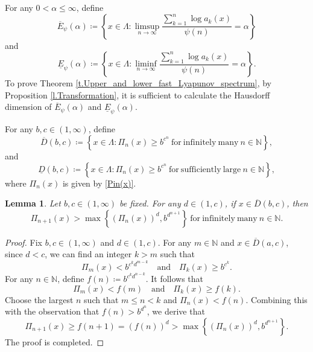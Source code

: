 \documentclass[12pt,reqno]{amsart}
\renewcommand{\=}{\coloneqq}
\theoremstyle{plain}
\newtheorem{lemma}[theorem]{Lemma}
\begin{document}
For any $0< \alpha \leq \infty$, define
\begin{equation*}\label{e.def_E_psi_alpha}
        \overline{E}_{\psi}(\alpha)\coloneqq
        \left\{x\in \Lambda:\limsup_{n \to \infty}
        \frac{\sum_{k=1}^n \log a_{k}(x)}{\psi(n)}= \alpha \right\}
\end{equation*}
and
\[
  \underline{E}_{\psi}(\alpha)\coloneqq
        \left\{x\in \Lambda:\liminf_{n \to \infty}
        \frac{\sum_{k=1}^n \log a_{k}(x)}{\psi(n)}= \alpha \right\}.
\]
To prove Theorem \ref{t.Upper_and_lower_fast_Lyapunov_spectrum}, by Proposition \ref{l.Transformation}, it is sufficient to calculate the Hausdorff dimension of $\overline{E}_{\psi}(\alpha)$ and $\underline{E}_{\psi}(\alpha)$.


For any $b,c \in (1,\infty)$, define
\begin{equation*}
    \overline{D}(b,c)\coloneqq \left\{x\in \Lambda:\Pi_{n}(x)\geq b^{c^n}\
\mathrm{for\ infinitely\ many}\ n\in \mathbb N\right\},
\end{equation*}
 and
 \begin{equation*}
     \underline{D}(b,c)\coloneqq
     \left\{x\in \Lambda: \Pi_{n}(x)\geq b^{c^n}\
\mathrm{for\ sufficiently\ large}\ n\in \mathbb N\right\},
\end{equation*}
where $\Pi_n(x)$ is given by \eqref{Pin(x)}.


\begin{lemma}\label{l.Luczak}
Let $b,c \in (1,\infty)$ be fixed. For any $d\in (1,c)$, if $x\in \overline{D}(b,c)$, then
        \begin{equation}\label{e.Pi_n>_max_i.m.}
                \Pi_{n+1}(x)>
                \max \left\{
                (\Pi_n(x))^d,b^{d^{n+1}}\right\}
                \ \mathrm{for\ infinitely\ many}\ n\in \mathbb N.
        \end{equation}
\end{lemma}

\begin{proof}
Fix $b,c \in (1,\infty)$ and $d\in (1,c)$. For any $m\in \mathbb{N}$ and $x\in \overline{D}(a,c)$, since $d<c$, we can find an integer $k>m$ such that
        \begin{equation*}
                \Pi_{m}(x)<b^{c^kd^{m-k}}
                \quad \mathrm{and}\quad
                \Pi_k(x)\geq b^{c^k}.
        \end{equation*}
For any $n \in \mathbb N$, define $f(n)\coloneqq b^{c^kd^{n-k}}$. It follows that
        \begin{equation*}
                \Pi_{m}(x)<f(m)\quad \mathrm{and}\quad
                \Pi_{k}(x)\geq f(k).
        \end{equation*}
 Choose the largest $n$ such that $m\leq n<k$ and $\Pi_n(x)<f(n)$. Combining this with the observation that $f(n) > b^{d^{n}}$, we derive that
        \begin{equation*}
                \Pi_{n+1}(x)\geq f(n+1)=
                (f(n))^d>\max \left\{
                        (\Pi_n(x))^d,
                        b^{d^{n+1}}
                \right\}.
        \end{equation*}
        The proof is completed.
\end{proof}
\end{document}
